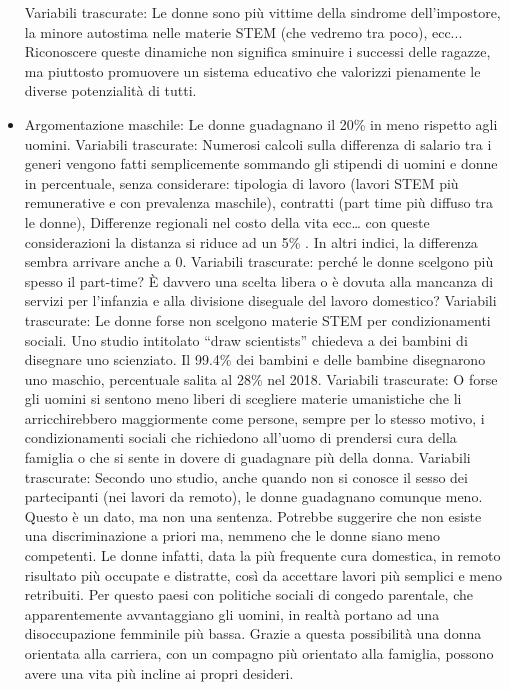 \documentclass[12pt]{book} %
\begin{document}
\begin{mdframed}[linewidth=1pt]
\begin{itemize}
Variabili trascurate: Le donne sono più vittime della sindrome dell’impostore, la minore autostima nelle materie STEM (che vedremo tra poco), ecc...
Riconoscere queste dinamiche non significa sminuire i successi delle ragazze, ma piuttosto promuovere un sistema educativo che valorizzi pienamente le diverse potenzialità di tutti.
\item Argomentazione maschile: Le donne guadagnano il 20\% in meno rispetto agli uomini.
Variabili trascurate: Numerosi calcoli sulla differenza di salario tra i generi vengono fatti semplicemente sommando gli stipendi di uomini e donne in percentuale, senza considerare: tipologia di lavoro (lavori STEM più remunerative e con prevalenza maschile), contratti (part time più diffuso tra le donne), Differenze regionali nel costo della vita ecc… con queste considerazioni la distanza si riduce ad un 5\% . In altri indici, la differenza sembra arrivare anche a 0.
Variabili trascurate: perché le donne scelgono più spesso il part-time? È davvero una scelta libera o è dovuta alla mancanza di servizi per l'infanzia e alla divisione diseguale del lavoro domestico?
Variabili trascurate: Le donne forse non scelgono materie STEM per condizionamenti sociali. Uno studio intitolato “draw scientists” chiedeva a dei bambini di disegnare uno scienziato. Il 99.4\% dei bambini e delle bambine disegnarono uno maschio, percentuale salita al 28\% nel 2018.
Variabili trascurate: O forse gli uomini si sentono meno liberi di scegliere materie umanistiche che li arricchirebbero maggiormente come persone, sempre per lo stesso motivo, i condizionamenti sociali che richiedono all'uomo di prendersi cura della famiglia o che si sente in dovere di guadagnare più della donna.
Variabili trascurate: Secondo uno studio, anche quando non si conosce il sesso dei partecipanti (nei lavori da remoto), le donne guadagnano comunque meno. Questo è un dato, ma non una sentenza. Potrebbe suggerire che non esiste una discriminazione a priori ma, nemmeno che le donne siano meno competenti. Le donne infatti, data la più frequente cura domestica, in remoto risultato più occupate e distratte, così da accettare lavori più semplici e meno retribuiti. Per questo paesi con politiche sociali di congedo parentale, che apparentemente avvantaggiano gli uomini, in realtà portano ad una disoccupazione femminile più bassa. Grazie a questa possibilità una donna orientata alla carriera, con un compagno più orientato alla famiglia, possono avere una vita più incline ai propri desideri. 
\end{itemize}


\end{mdframed}
\end{document}
